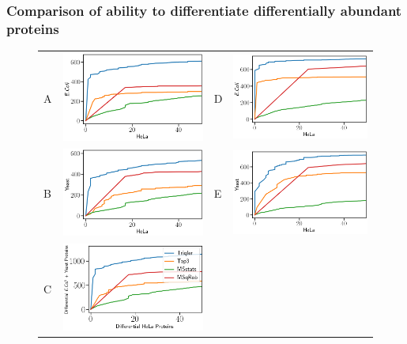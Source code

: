 \documentclass[11pt]{article}
\begin{document}
\subsubsection*{Comparison of ability to differentiate differentially abundant proteins}
\begin{figure}[hbt]
    \centering
    \begin{tabular}{lclc} 
        A & \includegraphics[width=0.4\linewidth]{../../result/report_plots_filtered/osw_de_human_vs_ecoli.png} & 
        D & \includegraphics[width=0.4\linewidth]{../../result/report_plots_filtered/diann_de_human_vs_ecoli.png} \\ 
        B & \includegraphics[width=0.4\linewidth]{../../result/report_plots_filtered/osw_de_human_vs_yeast.png} & 
        E & \includegraphics[width=0.4\linewidth]{../../result/report_plots_filtered/diann_de_human_vs_yeast.png} \\
        C & \includegraphics[width=0.45\linewidth]{../../result/report_plots_filtered/osw_de_human_vs_ecoli_and_yeast.png} & 

\end{tabular}
\end{figure}
\end{document}
